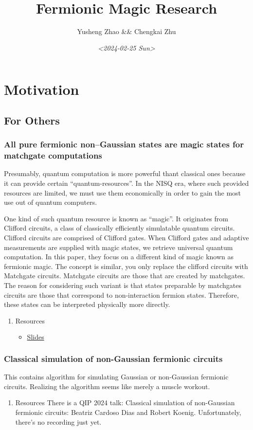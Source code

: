 \documentclass[11pt]{article}
\author{Yusheng Zhao \&\& Chengkai Zhu}
\date{\textit{<2024-02-25 Sun>}}
\title{Fermionic Magic Research}
\begin{document}
\maketitle
\tableofcontents

\section{Motivation}
\label{sec:orgee61e3a}
\subsection{For Others}
\label{sec:org9c001c9}
\subsubsection{All pure fermionic non–Gaussian states are magic states for matchgate computations}
\label{sec:orgba46165}
Presumably, quantum computation is more powerful thant classical ones because it
can provide certain ``quantum-resources''. In the NISQ era, where such provided
resources are limited, we must use them economically in order to gain the most
use out of quantum computers.

One kind of such quantum resource is known as ``magic''. It originates from
Clifford circuits, a class of classically efficiently simulatable quantum
circuits. Clifford circuits are comprised of Clifford gates. When Clifford gates
and adaptive measurements are supplied with magic states, we retrieve universal
quantum computation. In this paper, they focus on a different kind of magic
known as fermionic magic. The concept is similar, you only replace the clifford
circuits with Matchgate circuits. Matchgate circuits are those that are created
by matchgates. The reason for considering such variant is that states preparable
by matchgates circuits are those that correspond to non-interaction fermion
states. Therefore, these states can be interpreted physically more directly.
\begin{enumerate}
\item Resources
\label{sec:org0e2f176}
\begin{itemize}
\item \href{http://www.physics.usyd.edu.au/quantum/Coogee2020/Presentations/Jozsa.pdf}{Slides}
\end{itemize}
\end{enumerate}
\subsubsection{Classical simulation of non-Gaussian fermionic circuits}
\label{sec:org05242e3}
This contains algorithm for simulating Gaussian or non-Gaussian fermionic
circuits. Realizing the algorithm seems like merely a muscle workout.
\begin{enumerate}
\item Resources
\label{sec:orga5dc0a1}
There is a QIP 2024 talk: Classical simulation of non-Gaussian fermionic
circuits: Beatriz Cardoso Dias and Robert Koenig. Unfortunately, there's no
recording just yet.
\end{enumerate}
\end{document}

